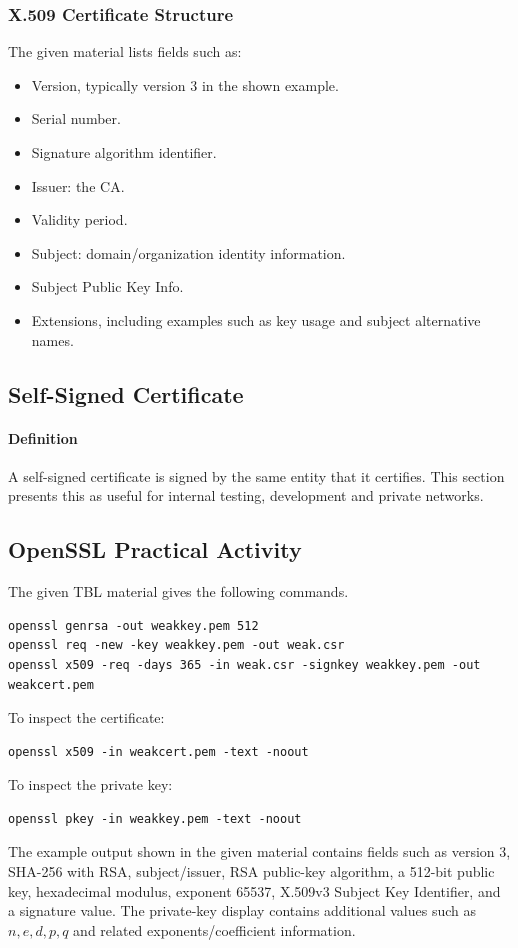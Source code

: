 \documentclass[12pt]{article}
\newcommand{\Definition}{\paragraph{Definition}}
\begin{document}
\subsubsection{X.509 Certificate Structure}
The given material lists fields such as:
\begin{itemize}
    \item Version, typically version 3 in the shown example.
    \item Serial number.
    \item Signature algorithm identifier.
    \item Issuer: the CA.
    \item Validity period.
    \item Subject: domain/organization identity information.
    \item Subject Public Key Info.
    \item Extensions, including examples such as key usage and subject alternative names.
\end{itemize}

\subsection{Self-Signed Certificate}
\Definition A self-signed certificate is signed by the same entity that it certifies. This section presents this as useful for internal testing, development and private networks.

\subsection{OpenSSL Practical Activity}
The given TBL material gives the following commands.

\begin{lstlisting}
openssl genrsa -out weakkey.pem 512
openssl req -new -key weakkey.pem -out weak.csr
openssl x509 -req -days 365 -in weak.csr -signkey weakkey.pem -out weakcert.pem
\end{lstlisting}

To inspect the certificate:
\begin{lstlisting}
openssl x509 -in weakcert.pem -text -noout
\end{lstlisting}

To inspect the private key:
\begin{lstlisting}
openssl pkey -in weakkey.pem -text -noout
\end{lstlisting}

The example output shown in the given material contains fields such as version 3, SHA-256 with RSA, subject/issuer, RSA public-key algorithm, a 512-bit public key, hexadecimal modulus, exponent 65537, X.509v3 Subject Key Identifier, and a signature value. The private-key display contains additional values such as $n,e,d,p,q$ and related exponents/coefficient information.
\end{document}
